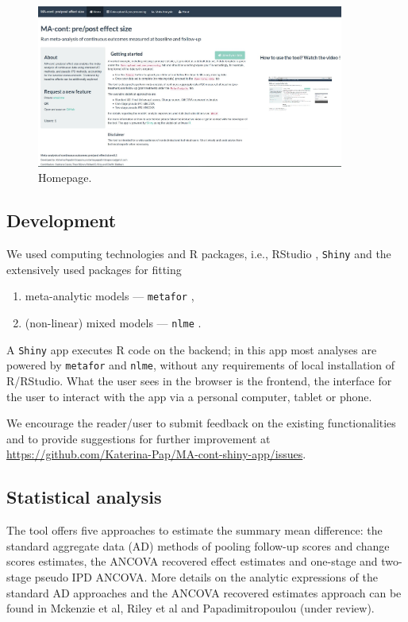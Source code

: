 \documentclass[AMA,STIX1COL]{WileyNJD-v2}
\begin{document}
\begin{figure}[t]
   \centering \includegraphics[width=0.9\textwidth]{homepage.JPG}
    \caption{\small {Homepage.}}\label{shiny-homepage}
\end{figure}

\newpage
\subsection{Development}

We used computing technologies and R packages, i.e., RStudio \citep{Rstudiocite}, \texttt{Shiny} \citep{chang2017shiny} and the extensively used packages for fitting
\begin{enumerate}
    \item meta-analytic models — \texttt{metafor} \citep{viechtbauer2010conducting},
    \item (non-linear) mixed models — \texttt{nlme} \citep{pinheiro2017package}.
\end{enumerate}
A \texttt{Shiny} app executes R code on the backend; in this app most analyses are powered by \texttt{metafor} and \texttt{nlme}, without any requirements of local installation of R/RStudio. What the user sees in the browser is the frontend, the interface for the user to interact with the app via a personal computer, tablet or phone.

We encourage the reader/user to submit feedback on the existing functionalities and to provide suggestions for further improvement at \url{https://github.com/Katerina-Pap/MA-cont-shiny-app/issues}.

\subsection{Statistical analysis}

The tool offers five approaches to estimate the summary mean difference: the standard aggregate data (AD) methods of pooling follow-up scores and change scores estimates, the ANCOVA recovered effect estimates and one-stage and two-stage pseudo IPD ANCOVA. More details on the analytic expressions of the standard AD approaches and the ANCOVA recovered estimates approach can be found in Mckenzie et al\cite{mckenzie2016impact}, Riley et al\cite{riley2013meta} and Papadimitropoulou (under review).
\end{document}
